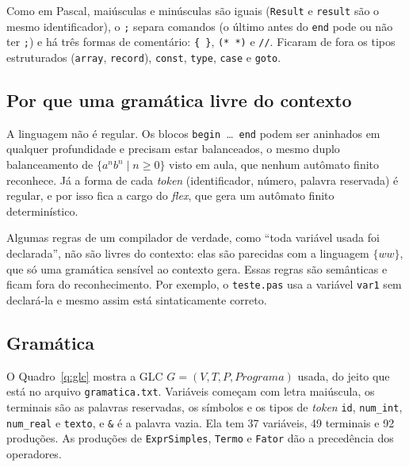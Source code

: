 \documentclass[12pt,a4paper]{article}
\newcommand{\code}[1]{\texttt{#1}}
\begin{document}
Como em Pascal, maiúsculas e minúsculas são iguais (\code{Result} e \code{result} são o mesmo
identificador), o \code{;} separa comandos (o último antes do \code{end} pode ou não ter
\code{;}) e há três formas de comentário: \code{\{ \}}, \code{(* *)} e \code{//}. Ficaram de
fora os tipos estruturados (\code{array}, \code{record}), \code{const}, \code{type},
\code{case} e \code{goto}.

\subsection{Por que uma gramática livre do contexto}

A linguagem não é regular. Os blocos \code{begin}~\dots~\code{end} podem ser aninhados em
qualquer profundidade e precisam estar balanceados, o mesmo duplo balanceamento de
$\{a^n b^n \mid n \ge 0\}$ visto em aula, que nenhum autômato finito reconhece. Já a forma de
cada \textit{token} (identificador, número, palavra reservada) é regular, e por isso fica a cargo
do \textit{flex}, que gera um autômato finito determinístico.

Algumas regras de um compilador de verdade, como ``toda variável usada foi declarada'', não são
livres do contexto: elas são parecidas com a linguagem $\{ww\}$, que só uma gramática sensível ao
contexto gera. Essas regras são semânticas e ficam fora do reconhecimento. Por exemplo, o
\code{teste.pas} usa a variável \code{var1} sem declará-la e mesmo assim está sintaticamente
correto.

\subsection{Gramática}

O Quadro~\ref{q:glc} mostra a GLC $G = (V, T, P, \mathit{Programa})$ usada, do jeito que
está no arquivo \code{gramatica.txt}. Variáveis começam com letra maiúscula, os terminais são as
palavras reservadas, os símbolos e os tipos de \textit{token} \code{id}, \code{num\_int},
\code{num\_real} e \code{texto}, e \code{\&} é a palavra vazia. Ela tem 37 variáveis, 49
terminais e 92 produções. As produções de \code{ExprSimples}, \code{Termo} e \code{Fator} dão a
precedência dos operadores.
\end{document}
